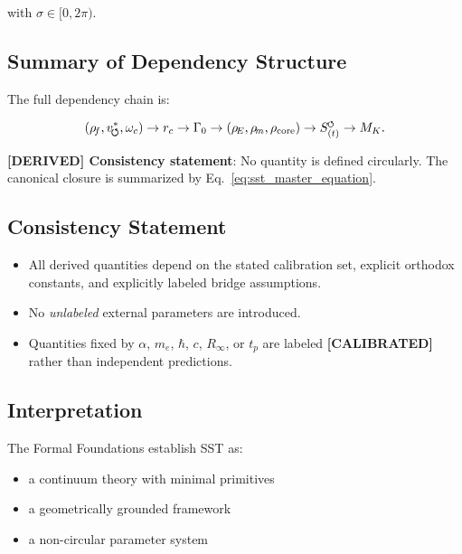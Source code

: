 \documentclass[11pt]{article}
\theoremstyle{definition}
\theoremstyle{plain}
\theoremstyle{remark}
\newcommand{\swirlarrow}{\mathchoice{\mkern-2mu\scriptstyle\boldsymbol{\circlearrowleft}}{\mkern-2mu\scriptstyle\boldsymbol{\circlearrowleft}}{\mkern-2mu\scriptscriptstyle\boldsymbol{\circlearrowleft}}{\mkern-2mu\scriptscriptstyle\boldsymbol{\circlearrowleft}}}
\newcommand{\rhoF}{{\rho_{\!f}}}
\newcommand{\rhoE}{\rho_{\!E}}
\newcommand{\rhoM}{\rho_{\!m}}
\newcommand{\rhocore}{\rho_{\mathrm{core}}}
\newcommand{\SwirlClock}{{S_{(t)}^{\swirlarrow}}}
\newcommand{\rc}{{r_c}}
\newcommand{\vchar}{v_{\!\boldsymbol{\circlearrowleft}}^{\ast}}
\begin{document}
        with $\sigma \in [0,2\pi)$.
    
    \subsection{Summary of Dependency Structure}
        
        The full dependency chain is:
        
        \begin{align}
        (\rhoF, \vchar, \omega_c)
            \rightarrow \rc
            \rightarrow \Gamma_0
            \rightarrow (\rhoE, \rhoM, \rhocore)
            \rightarrow \SwirlClock
            \rightarrow M_K.
        \end{align}
        
        \textbf{[DERIVED] Consistency statement}:
        No quantity is defined circularly. The canonical closure is summarized by Eq.~\ref{eq:sst_master_equation}.
    
    \subsection{Consistency Statement}
        
        \begin{itemize}
            \item All derived quantities depend on the stated calibration set, explicit orthodox constants, and explicitly labeled bridge assumptions.
            \item No \emph{unlabeled} external parameters are introduced.
            \item Quantities fixed by $\alpha$, $m_e$, $\hbar$, $c$, $R_\infty$, or $t_p$ are labeled \textbf{[CALIBRATED]} rather than independent predictions.
        \end{itemize}
    
    \subsection{Interpretation}
        
        The Formal Foundations establish SST as:
        
        \begin{itemize}
            \item a continuum theory with minimal primitives
            \item a geometrically grounded framework
            \item a non-circular parameter system
        \end{itemize}
\end{document}

